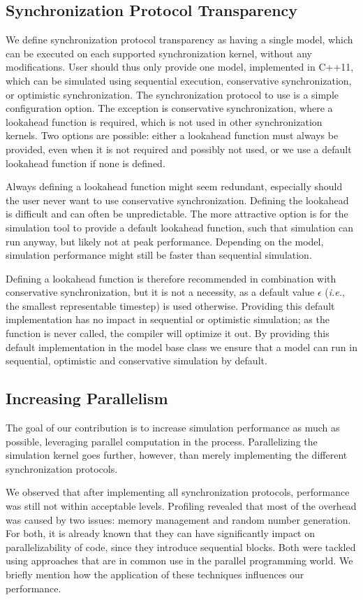 \subsection{Synchronization Protocol Transparency}
We define synchronization protocol transparency as having a single model, which can be executed on each supported synchronization kernel, without any modifications.
User should thus only provide one model, implemented in C++11, which can be simulated using sequential execution, conservative synchronization, or optimistic synchronization.
The synchronization protocol to use is a simple configuration option.
The exception is conservative synchronization, where a lookahead function is required, which is not used in other synchronization kernels.
Two options are possible: either a lookahead function must always be provided, even when it is not required and possibly not used, or we use a default lookahead function if none is defined.

Always defining a lookahead function might seem redundant, especially should the user never want to use conservative synchronization.
Defining the lookahead is difficult and can often be unpredictable.
The more attractive option is for the simulation tool to provide a default lookahead function, such that simulation can run anyway, but likely not at peak performance.
Depending on the model, simulation performance might still be faster than sequential simulation. 

Defining a lookahead function is therefore recommended in combination with conservative synchronization, but it is not a necessity, as a default value $\epsilon$ (\textit{i.e.}, the smallest representable timestep) is used otherwise.
Providing this default implementation has no impact in sequential or optimistic simulation; as the function is never called, the compiler will optimize it out.
By providing this default implementation in the model base class we ensure that a model can run in sequential, optimistic and conservative simulation by default.

\subsection{Increasing Parallelism}
The goal of our contribution is to increase simulation performance as much as possible, leveraging parallel computation in the process.
Parallelizing the simulation kernel goes further, however, than merely implementing the different synchronization protocols.

We observed that after implementing all synchronization protocols, performance was still not within acceptable levels.
Profiling revealed that most of the overhead was caused by two issues: memory management and random number generation.
For both, it is already known that they can have significantly impact on parallelizability of code, since they introduce sequential blocks.
Both were tackled using approaches that are in common use in the parallel programming world.
We briefly mention how the application of these techniques influences our performance.

